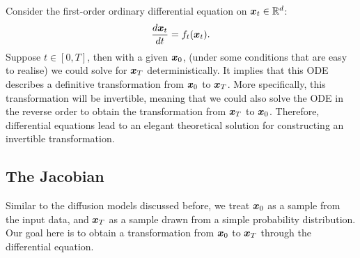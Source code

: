Consider the first-order ordinary differential equation on $\bm{x}_{t}\in\mathbb{R}^d$:
\begin{equation}
    \label{eq:12.1}
    \frac{d\bm{x}_{t}}{dt}=f_{t}(\bm{x}_{t}).
\end{equation}
Suppose $t\in[0,T]$, then with a given $\bm{x}_0$, (under some conditions that are easy to realise) we could solve for $\bm{x}_T$ deterministically. It implies that this ODE describes a definitive transformation from $\bm{x}_0$ to $\bm{x}_T$. More specifically, this transformation will be invertible, meaning that we could also solve the ODE in the reverse order to obtain the transformation from $\bm{x}_T$ to $\bm{x}_0$. Therefore, differential equations lead to an elegant theoretical solution for constructing an invertible transformation.

\subsection{The Jacobian}

Similar to the diffusion models discussed before, we treat $\bm{x}_0$ as a sample from the input data, and $\bm{x}_T$ as a sample drawn from a simple probability distribution. Our goal here is to obtain a transformation from $\bm{x}_0$ to $\bm{x}_T$ through the differential equation. 

